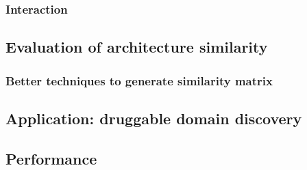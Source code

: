 \subsubsection{Interaction}

\subsection{Evaluation of architecture similarity}

\subsubsection{Better techniques to generate similarity matrix}

\subsection{Application: druggable domain discovery}

\subsection{Performance}


